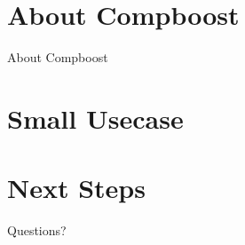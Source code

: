 






\section{About Compboost}
\begin{frame}{About Compboost}



\end{frame}


\section{Small Usecase}
\begin{frame}{}



\end{frame}

\section{Next Steps}
\begin{frame}{}



\end{frame}


\begin{frame}
  Questions?
\end{frame}



